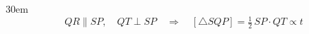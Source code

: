 \documentclass[border=4pt]{standalone}
\begin{document}
\begin{varwidth}{30em}
\large
\[ QR \parallel SP,\quad QT \perp SP \quad\Rightarrow\quad [\triangle SQP] = \tfrac{1}{2}\,SP\cdot QT \propto t \]

\end{varwidth}
\end{document}
